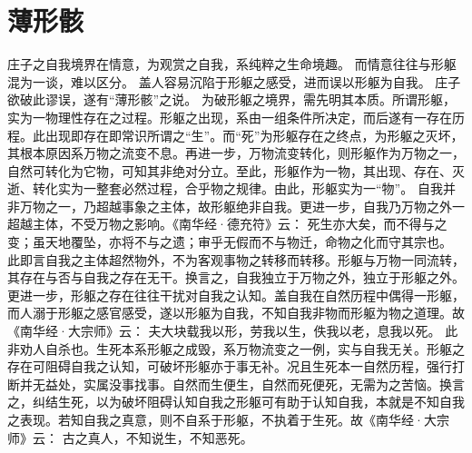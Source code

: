 \documentclass[11pt]{article}
\begin{document}
\section{薄形骸}
庄子之自我境界在情意，为观赏之自我，系纯粹之生命境趣。
而情意往往与形躯混为一谈，难以区分。
盖人容易沉陷于形躯之感受，进而误以形躯为自我。
庄子欲破此谬误，遂有“薄形骸”之说。
为破形躯之境界，需先明其本质。所谓形躯，实为一物理性存在之过程。形躯之出现，系由一组条件所决定，而后遂有一存在历程。此出现即存在即常识所谓之“生”。而“死”为形躯存在之终点，为形躯之灭坏，其根本原因系万物之流变不息。再进一步，万物流变转化，则形躯作为万物之一，自然可转化为它物，可知其非绝对分立。至此，形躯作为一物，其出现、存在、灭逝、转化实为一整套必然过程，合乎物之规律。由此，形躯实为一“物”。
自我并非万物之一，乃超越事象之主体，故形躯绝非自我。更进一步，自我乃万物之外一超越主体，不受万物之影响。《南华经·德充符》云：
死生亦大矣，而不得与之变；虽天地覆坠，亦将不与之遗；审乎无假而不与物迁，命物之化而守其宗也。
此即言自我之主体超然物外，不为客观事物之转移而转移。形躯与万物一同流转，其存在与否与自我之存在无干。换言之，自我独立于万物之外，独立于形躯之外。
更进一步，形躯之存在往往干扰对自我之认知。盖自我在自然历程中偶得一形躯，而人溺于形躯之感官感受，遂以形躯为自我，不知自我非物而形躯为物之道理。故《南华经·大宗师》云：
夫大块载我以形，劳我以生，佚我以老，息我以死。
此非劝人自杀也。生死本系形躯之成毁，系万物流变之一例，实与自我无关。形躯之存在可阻碍自我之认知，可破坏形躯亦于事无补。况且生死本一自然历程，强行打断并无益处，实属没事找事。自然而生便生，自然而死便死，无需为之苦恼。换言之，纠结生死，以为破坏阻碍认知自我之形躯可有助于认知自我，本就是不知自我之表现。若知自我之真意，则不自系于形躯，不执着于生死。故《南华经·大宗师》云：
古之真人，不知说生，不知恶死。
\end{document}
